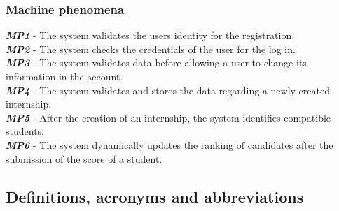 \documentclass[11pt,twoside]{article}
\begin{document}
		\subsubsection{Machine phenomena}
\begin{spacing}{1.5}
\textbf{\textit{MP1}} - The system validates the users identity for the registration. \\
\textbf{\textit{MP2}} - The system checks the credentials of the user for the log in. \\
\textbf{\textit{MP3}} - The system validates data before allowing a user to change its information in the account. \\
\textbf{\textit{MP4}} - The system validates and stores the data regarding a newly created internship. \\
\textbf{\textit{MP5}} - After the creation of an internship, the system identifies compatible students. \\
\textbf{\textit{MP6}} - The system dynamically updates the ranking of candidates after the submission of the score of a student. 
\end{spacing}
	\subsection{Definitions, acronyms and abbreviations}
\end{document}
